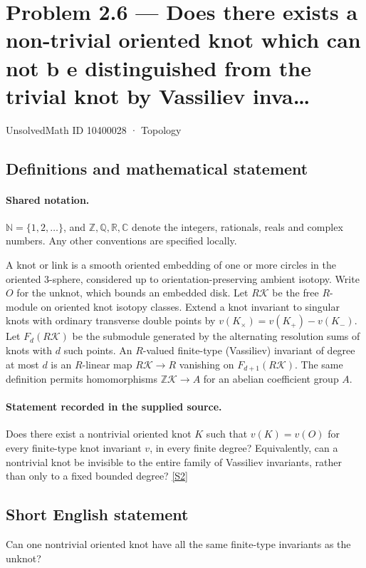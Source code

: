 \documentclass[11pt]{article}
\newcommand{\sref}[2]{\hyperlink{source:#1:#2}{[S#2]}}
\begin{document}
\setcounter{section}{10400027}
\section{Problem 2.6 — Does there exists a non-trivial oriented knot which can not b e distinguished from the trivial knot by Vassiliev inva…}\label{10400028}
{\small\sffamily UnsolvedMath ID 10400028 · Topology}
\subsection{Definitions and mathematical statement}

\paragraph{Shared notation.}$\mathbb N=\{1,2,\ldots\}$, and $\mathbb Z,\mathbb Q,\mathbb R,\mathbb C$ denote the integers, rationals, reals and complex numbers. Any other conventions are specified locally.


A knot or link is a smooth oriented embedding of one or more circles in the oriented $3$-sphere, considered up to orientation-preserving ambient isotopy. Write $O$ for the unknot, which bounds an embedded disk. Let $R\mathcal K$ be the free $R$-module on oriented knot isotopy classes. Extend a knot invariant to singular knots with ordinary transverse double points by $v(K_\times)=v(K_+)-v(K_-)$. Let $F_d(R\mathcal K)$ be the submodule generated by the alternating resolution sums of knots with $d$ such points. An $R$-valued finite-type (Vassiliev) invariant of degree at most $d$ is an $R$-linear map $R\mathcal K\to R$ vanishing on $F_{d+1}(R\mathcal K)$. The same definition permits homomorphisms $\mathbb Z\mathcal K\to A$ for an abelian coefficient group $A$.
\paragraph{Statement recorded in the supplied source.}
Does there exist a nontrivial oriented knot $K$ such that $v(K)=v(O)$ for every finite-type knot invariant $v$, in every finite degree? Equivalently, can a nontrivial knot be invisible to the entire family of Vassiliev invariants, rather than only to a fixed bounded degree? \sref{10400028}{2}
\subsection{Short English statement}
Can one nontrivial oriented knot have all the same finite-type invariants as the unknot?
\end{document}
